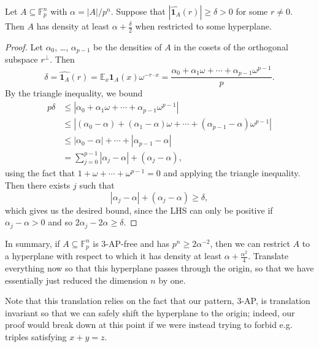 \documentclass[10pt]{scrartcl}
\providecommand{\EE}{\mathbb E}
\providecommand{\FF}{\mathbb F}
\providecommand{\ind}[1]{\mathbf 1_{#1}}
\renewcommand{\hat}{\widehat}
\begin{document}
\begin{lemma}
	Let $A\subseteq \FF_p^n$ with $\alpha = |A|/p^n$.
	Suppose that $|\hat{\ind A}(r)| \ge\delta > 0$ for some $r\ne 0$.
	Then $A$ has density at least $\alpha + \frac\delta 2$
	when restricted to some hyperplane.
\end{lemma}

\begin{proof}
	Let $\alpha_0$, \dots, $\alpha_{p-1}$ be the densities of $A$
	in the cosets of the orthogonal subspace $r^\perp$. Then
	\[\delta = \hat{\ind A}(r) = \EE_x\ind A(x)\omega^{-r\cdot x}
	= \frac{\alpha_0 + \alpha_1\omega + \cdots + \alpha_{p-1}\omega^{p-1}}{p}.\]
	By the triangle inequality, we bound
	\begin{align*}
		p\delta &\le
		|\alpha_0 + \alpha_1\omega + \cdots + \alpha_{p-1}\omega^{p-1}|\\
		&\le |(\alpha_0-\alpha) + (\alpha_1-\alpha)\omega+\cdots+
		(\alpha_{p-1}-\alpha)\omega^{p-1}|\\
		&\le |\alpha_0-\alpha| + \cdots + |\alpha_{p-1}-\alpha|\\
		&= \sum_{j=0}^{p-1} |\alpha_j-\alpha| + (\alpha_j-\alpha),
	\end{align*}
	using the fact that $1+\omega+\cdots+\omega^{p-1}=0$
	and applying the triangle inequality.
	Then there exists $j$ such that
	\[|\alpha_j-\alpha| + (\alpha_j-\alpha) \ge \delta,\]
	which gives us the desired bound, since the LHS can only be positive
	if $\alpha_j-\alpha>0$ and so $2\alpha_j-2\alpha\ge\delta$.
\end{proof}

In summary, if $A\subseteq \FF_p^n$ is 3-AP-free and has
$p^n\ge 2\alpha^{-2}$, then we can restrict $A$ to a hyperplane
with respect to which it has density at least $\alpha + \frac{\alpha^2}4$.
Translate everything now so that this hyperplane passes through the origin,
so that we have essentially just reduced the dimension $n$ by one.
\begin{remark}
	Note that this translation relies on the fact that
	our pattern, 3-AP, is translation invariant so that we can safely
	shift the hyperplane to the origin;
	indeed, our proof would break down at this point
	if we were instead trying to forbid e.g. triples satisfying $x+y=z$.
\end{remark}
\end{document}

